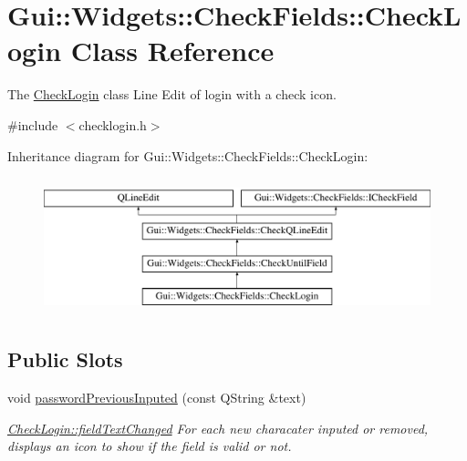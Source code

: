 \hypertarget{classGui_1_1Widgets_1_1CheckFields_1_1CheckLogin}{\section{Gui\-:\-:Widgets\-:\-:Check\-Fields\-:\-:Check\-Login Class Reference}
\label{classGui_1_1Widgets_1_1CheckFields_1_1CheckLogin}
}


The \hyperlink{classGui_1_1Widgets_1_1CheckFields_1_1CheckLogin}{Check\-Login} class Line Edit of login with a check icon.  




{\ttfamily \#include $<$checklogin.\-h$>$}

Inheritance diagram for Gui\-:\-:Widgets\-:\-:Check\-Fields\-:\-:Check\-Login\-:\begin{figure}[H]
\begin{center}
\leavevmode
\includegraphics[height=4.000000cm]{dd/dfe/classGui_1_1Widgets_1_1CheckFields_1_1CheckLogin}
\end{center}
\end{figure}
\subsection*{Public Slots}
\begin{DoxyCompactItemize}
\item 
\hypertarget{classGui_1_1Widgets_1_1CheckFields_1_1CheckLogin_a2d58496a2b60c529b0c74e930622fcee}{void \hyperlink{classGui_1_1Widgets_1_1CheckFields_1_1CheckLogin_a2d58496a2b60c529b0c74e930622fcee}{password\-Previous\-Inputed} (const Q\-String \&text)}\label{classGui_1_1Widgets_1_1CheckFields_1_1CheckLogin_a2d58496a2b60c529b0c74e930622fcee}

\begin{DoxyCompactList}\small\item\em \hyperlink{classGui_1_1Widgets_1_1CheckFields_1_1CheckQLineEdit_ad297d518964bd170e8cc7533795ff99e}{Check\-Login\-::field\-Text\-Changed} For each new characater inputed or removed, displays an icon to show if the field is valid or not. \end{DoxyCompactList}\end{DoxyCompactItemize}
